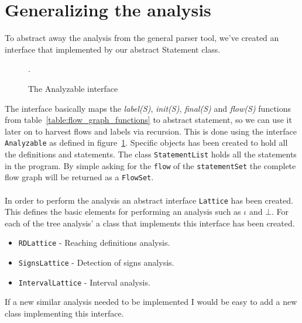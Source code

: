 \section{Generalizing the analysis}
To abstract away the analysis from the general parser tool, we've created an interface that implemented by our abstract Statement class.
\begin{figure}
\centering
{}
\caption{The Analyzable interface}
\label{fig:analysable_basic_definition}.
\end{figure}The interface basically maps the \textit{label(S)}, \textit{init(S)}, \textit{final(S)} and \textit{flow(S)} functions from table~\ref{table:flow_graph_functions} to abstract statement, so we can use it later on to harvest flows and labels via recursion. This is done using the interface \texttt{Analyzable} as defined in figure~\ref{fig:analysable_basic_definition}.
Specific objects has been created to hold all the definitions and statements. The class \texttt{StatementList} holds all the statements in the program. By simple asking for the \texttt{flow} of the \texttt{statementSet} the complete flow graph will be returned as a \texttt{FlowSet}.
\\\\
In order to perform the analysis an abstract interface \texttt{Lattice} has been created. This defines the basic elements for performing an analysis such as $\iota$ and $\bot$. For each of the tree analysis' a class that implements this interface has been created.
\begin{itemize}
	\item \texttt{RDLattice} - Reaching definitions analysis.
	\item \texttt{SignsLattice} - Detection of signs analysis.
	\item \texttt{IntervalLattice} - Interval analysis.
\end{itemize}
If a new similar analysis needed to be implemented I would be easy to add a new class implementing this interface.


